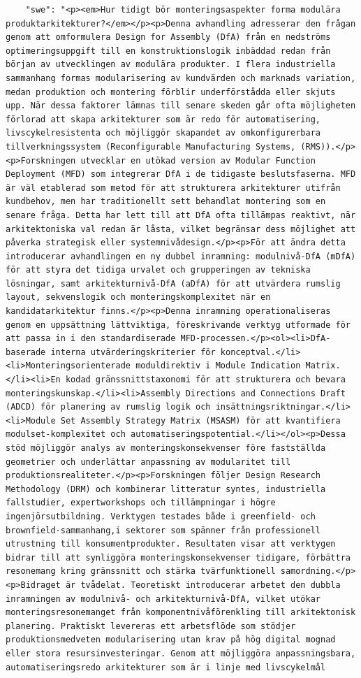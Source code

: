 \begin{casestudySection}
\begin{lstlisting}
    "swe": "<p><em>Hur tidigt bör monteringsaspekter forma modulära produktarkitekturer?</em></p><p>Denna avhandling adresserar den frågan genom att omformulera Design for Assembly (DfA) från en nedströms optimeringsuppgift till en konstruktionslogik inbäddad redan från början av utvecklingen av modulära produkter. I flera industriella sammanhang formas modularisering av kundvärden och marknads variation, medan produktion och montering förblir underförstådda eller skjuts upp. När dessa faktorer lämnas till senare skeden går ofta möjligheten förlorad att skapa arkitekturer som är redo för automatisering, livscykelresistenta och möjliggör skapandet av omkonfigurerbara tillverkningssystem (Reconfigurable Manufacturing Systems, (RMS)).</p><p>Forskningen utvecklar en utökad version av Modular Function Deployment (MFD) som integrerar DfA i de tidigaste beslutsfaserna. MFD är väl etablerad som metod för att strukturera arkitekturer utifrån kundbehov, men har traditionellt sett behandlat montering som en senare fråga. Detta har lett till att DfA ofta tillämpas reaktivt, när arkitektoniska val redan är låsta, vilket begränsar dess möjlighet att påverka strategisk eller systemnivådesign.</p><p>För att ändra detta introducerar avhandlingen en ny dubbel inramning: modulnivå-DfA (mDfA) för att styra det tidiga urvalet och grupperingen av tekniska lösningar, samt arkitekturnivå-DfA (aDfA) för att utvärdera rumslig layout, sekvenslogik och monteringskomplexitet när en kandidatarkitektur finns.</p><p>Denna inramning operationaliseras genom en uppsättning lättviktiga, föreskrivande verktyg utformade för att passa in i den standardiserade MFD-processen.</p><ol><li>DfA-baserade interna utvärderingskriterier för konceptval.</li><li>Monteringsorienterade moduldirektiv i Module Indication Matrix.</li><li>En kodad gränssnittstaxonomi för att strukturera och bevara monteringskunskap.</li><li>Assembly Directions and Connections Draft (ADCD) för planering av rumslig logik och insättningsriktningar.</li><li>Module Set Assembly Strategy Matrix (MSASM) för att kvantifiera modulset-komplexitet och automatiseringspotential.</li></ol><p>Dessa stöd möjliggör analys av monteringskonsekvenser före fastställda geometrier och underlättar anpassning av modularitet till produktionsrealiteter.</p><p>Forskningen följer Design Research Methodology (DRM) och kombinerar litteratur syntes, industriella fallstudier, expertworkshops och tillämpningar i högre ingenjörsutbildning. Verktygen testades både i greenfield- och brownfield-sammanhang,i sektorer som spänner från professionell utrustning till konsumentprodukter. Resultaten visar att verktygen bidrar till att synliggöra monteringskonsekvenser tidigare, förbättra resonemang kring gränssnitt och stärka tvärfunktionell samordning.</p><p>Bidraget är tvådelat. Teoretiskt introducerar arbetet den dubbla inramningen av modulnivå- och arkitekturnivå-DfA, vilket utökar monteringsresonemanget från komponentnivåförenkling till arkitektonisk planering. Praktiskt levereras ett arbetsflöde som stödjer produktionsmedveten modularisering utan krav på hög digital mognad eller stora resursinvesteringar. Genom att möjliggöra anpassningsbara, automatiseringsredo arkitekturer som är i linje med livscykelmål 
\end{lstlisting}
\end{casestudySection}
